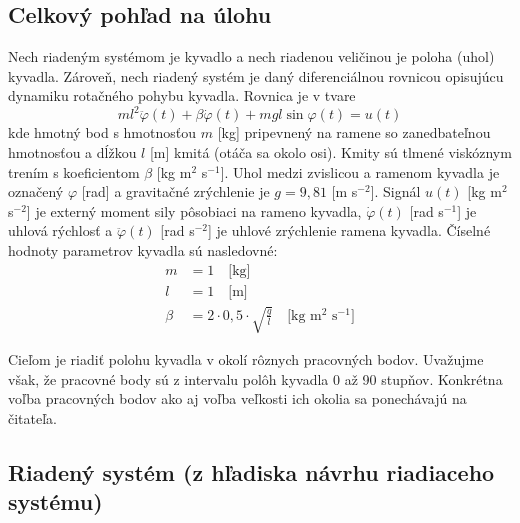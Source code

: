 \documentclass[a4paper, 10pt, ]{article}
\begin{document}
\subsection{Celkový pohľad na úlohu}

Nech riadeným systémom je kyvadlo a nech riadenou veličinou je poloha (uhol) kyvadla. Zároveň, nech riadený systém je daný diferenciálnou rovnicou opisujúcu dynamiku rotačného pohybu kyvadla. Rovnica je v tvare
\begin{equation} \label{analOpRS}
    ml^2 \ddot{\varphi}(t) + \beta \dot{\varphi}(t) + mgl\sin{\varphi(t)} = u(t)
\end{equation}
kde hmotný bod s hmotnosťou $m$ [kg] pripevnený na ramene so zanedbateľnou hmotnosťou a dĺžkou $l$ [m] kmitá (otáča sa okolo osi). Kmity sú tlmené viskóznym trením s koeficientom $\beta$ [kg m$^2$ s$^{-1}$]. Uhol medzi zvislicou a ramenom kyvadla je označený $\varphi$ [rad] a gravitačné zrýchlenie je $g = 9,81$ [m s$^{-2}$]. Signál $u(t)$ [kg m$^2$ s$^{-2}$] je externý moment sily pôsobiaci na rameno kyvadla, $\dot{\varphi}(t)$ [rad s$^{-1}$] je uhlová rýchlosť a $\ddot{\varphi}(t)$ [rad s$^{-2}$] je uhlové zrýchlenie ramena kyvadla.
Číselné hodnoty parametrov kyvadla sú nasledovné:
\begin{align*}
	m &= 1 \quad \text{[kg]}\\
	l &= 1 \quad \text{[m]}\\
	\beta &= 2 \cdot 0,5 \cdot \sqrt{\frac{g}{l}} \quad \text{[kg m$^2$ s$^{-1}$]}
\end{align*}

Cieľom je riadiť polohu kyvadla v okolí rôznych pracovných bodov. Uvažujme však, že pracovné body sú z intervalu polôh kyvadla 0 až 90 stupňov. Konkrétna voľba pracovných bodov ako aj voľba veľkosti ich okolia sa ponechávajú na čitateľa.






\subsection{Riadený systém (z hľadiska návrhu riadiaceho systému)}
\end{document}
